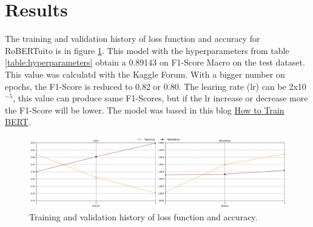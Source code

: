 \section{Results}

The training and validation history of loss function and accuracy for RoBERTuito is in figure \ref{fig:history}. This model with the hyperparameters from table \ref{table:hyperparameters} obtain a 0.89143 on F1-Score Macro on the test dataset. This value was calculatd with the Kaggle Forum. With a bigger number on epochs, the F1-Score is reduced to 0.82 or 0.80. The learing rate (lr) can be 2x10$^{-5}$, this value can produce same F1-Scores, but if the lr increase or decrease more the F1-Score will be lower. The model was based in this blog \href{https://towardsdatascience.com/how-to-train-bert-aaad00533168}{How to Train BERT}.

\begin{figure}[H]
    \centering
    \includegraphics[width=15cm]{Graphics/history.png}
    \caption{Training and validation history of loss function and accuracy.}
    \label{fig:history}
\end{figure}